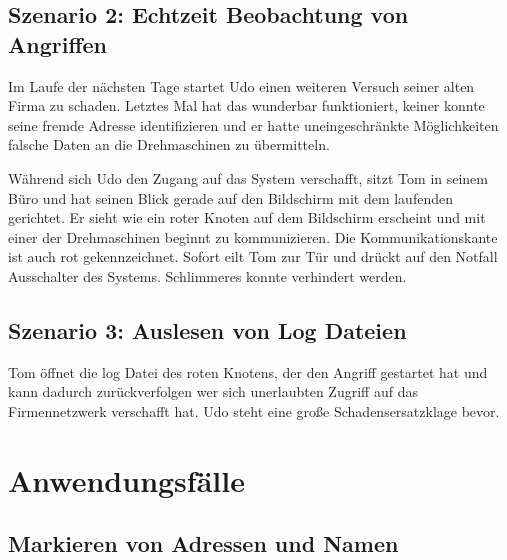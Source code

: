 \subsection{Szenario 2: Echtzeit Beobachtung von Angriffen}

Im Laufe der nächsten Tage startet Udo einen weiteren Versuch seiner alten Firma zu schaden. Letztes Mal hat das wunderbar funktioniert, keiner konnte seine fremde Adresse identifizieren und er hatte uneingeschränkte Möglichkeiten falsche Daten an die Drehmaschinen zu übermitteln.

Während sich Udo den Zugang auf das System verschafft, sitzt Tom in seinem Büro und hat seinen Blick gerade auf den Bildschirm mit dem laufenden \programname gerichtet. Er sieht wie ein roter Knoten auf dem Bildschirm erscheint und mit einer der Drehmaschinen beginnt zu kommunizieren. Die Kommunikationskante ist auch rot gekennzeichnet. Sofort eilt Tom zur Tür und drückt auf den Notfall Ausschalter des Systems. Schlimmeres konnte verhindert werden.

\subsection{Szenario 3: Auslesen von Log Dateien}

Tom öffnet die log Datei des roten Knotens, der den Angriff gestartet hat und kann dadurch zurückverfolgen wer sich unerlaubten Zugriff auf das Firmennetzwerk verschafft hat. Udo steht eine große Schadensersatzklage bevor.


\section{Anwendungsfälle}

\subsection{Markieren von Adressen und Namen}

